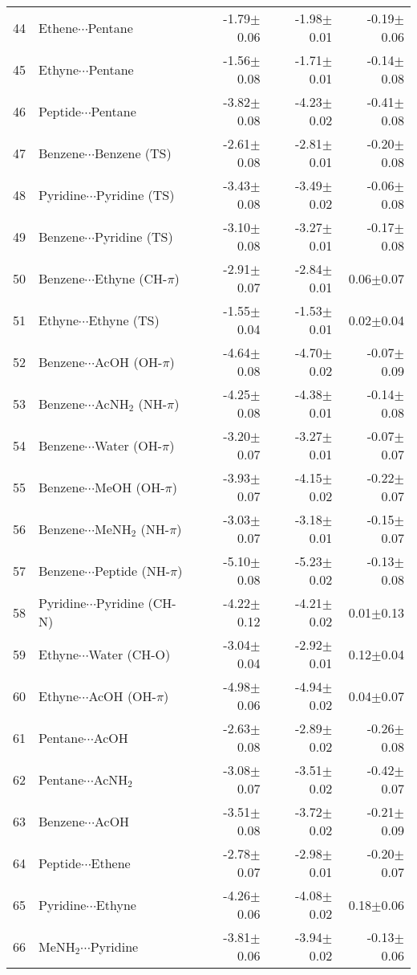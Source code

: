 \begin{longtable}{llrrr}
44 & Ethene$\cdots$Pentane & -1.79$\pm$0.06 & -1.98$\pm$0.01 & -0.19$\pm$0.06  \\
45 & Ethyne$\cdots$Pentane & -1.56$\pm$0.08 & -1.71$\pm$0.01 & -0.14$\pm$0.08  \\
46 & Peptide$\cdots$Pentane & -3.82$\pm$0.08 & -4.23$\pm$0.02 & -0.41$\pm$0.08  \\
47 & Benzene$\cdots$Benzene (TS) & -2.61$\pm$0.08 & -2.81$\pm$0.01 & -0.20$\pm$0.08  \\
48 & Pyridine$\cdots$Pyridine (TS) & -3.43$\pm$0.08 & -3.49$\pm$0.02 & -0.06$\pm$0.08  \\
49 & Benzene$\cdots$Pyridine (TS) & -3.10$\pm$0.08 & -3.27$\pm$0.01 & -0.17$\pm$0.08  \\
50 & Benzene$\cdots$Ethyne (CH-$\pi$) & -2.91$\pm$0.07 & -2.84$\pm$0.01 & 0.06$\pm$0.07  \\
51 & Ethyne$\cdots$Ethyne (TS) & -1.55$\pm$0.04 & -1.53$\pm$0.01 & 0.02$\pm$0.04  \\
52 & Benzene$\cdots$AcOH (OH-$\pi$) & -4.64$\pm$0.08 & -4.70$\pm$0.02 & -0.07$\pm$0.09  \\
53 & Benzene$\cdots$AcNH$_2$ (NH-$\pi$) & -4.25$\pm$0.08 & -4.38$\pm$0.01 & -0.14$\pm$0.08  \\
54 & Benzene$\cdots$Water (OH-$\pi$) & -3.20$\pm$0.07 & -3.27$\pm$0.01 & -0.07$\pm$0.07  \\
55 & Benzene$\cdots$MeOH (OH-$\pi$) & -3.93$\pm$0.07 & -4.15$\pm$0.02 & -0.22$\pm$0.07  \\
56 & Benzene$\cdots$MeNH$_2$ (NH-$\pi$) & -3.03$\pm$0.07 & -3.18$\pm$0.01 & -0.15$\pm$0.07  \\
57 & Benzene$\cdots$Peptide (NH-$\pi$) & -5.10$\pm$0.08 & -5.23$\pm$0.02 & -0.13$\pm$0.08  \\
58 & Pyridine$\cdots$Pyridine (CH-N) & -4.22$\pm$0.12 & -4.21$\pm$0.02 & 0.01$\pm$0.13  \\
59 & Ethyne$\cdots$Water (CH-O) & -3.04$\pm$0.04 & -2.92$\pm$0.01 & 0.12$\pm$0.04  \\
60 & Ethyne$\cdots$AcOH (OH-$\pi$) & -4.98$\pm$0.06 & -4.94$\pm$0.02 & 0.04$\pm$0.07  \\
61 & Pentane$\cdots$AcOH & -2.63$\pm$0.08 & -2.89$\pm$0.02 & -0.26$\pm$0.08  \\
62 & Pentane$\cdots$AcNH$_2$ & -3.08$\pm$0.07 & -3.51$\pm$0.02 & -0.42$\pm$0.07  \\
63 & Benzene$\cdots$AcOH & -3.51$\pm$0.08 & -3.72$\pm$0.02 & -0.21$\pm$0.09  \\
64 & Peptide$\cdots$Ethene & -2.78$\pm$0.07 & -2.98$\pm$0.01 & -0.20$\pm$0.07  \\
65 & Pyridine$\cdots$Ethyne & -4.26$\pm$0.06 & -4.08$\pm$0.02 & 0.18$\pm$0.06  \\
66 & MeNH$_2$$\cdots$Pyridine & -3.81$\pm$0.06 & -3.94$\pm$0.02 & -0.13$\pm$0.06  \\
\end{longtable}\normalsize